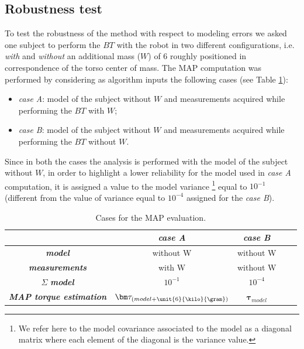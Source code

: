 \subsection{Robustness test}
To test the robustness of the method with respect to modeling errors we asked one subject to
perform the $BT$ with the robot in two different configurations, i.e. \emph{with} and
 \emph{without} an additional mass ($W$) of \unit{6}{\kilo}{\gram} roughly positioned in
  correspondence of the torso center of mass. The MAP computation was performed by
   considering as algorithm inputs the following cases (see Table \ref{table:robustness}):
	\begin{itemize}
		\item \emph{case A}: model of the subject without $W$ and measurements acquired 
		while performing the $BT$ with $W$;
		\item \emph{case B}: model of the subject without $W$ and measurements acquired 
		while performing the $BT$ without $W$.
		\end{itemize} 
Since in both the cases the analysis is performed with the model  of the subject without $W$, in
order to highlight a lower reliability for the model used in 
\emph{case A} computation, it is assigned a value to the model variance
\footnote{We refer here to the model covariance associated to the model as a diagonal matrix 
where each element of the diagonal is the variance value.}
 equal to $10^{-1}$ 
(different from the value of variance equal to $10^{-4}$ assigned for the \emph{case B}).
%
\begin{table}[H]
\caption{Cases for the MAP evaluation.}
\label{table:robustness}
\centering
\footnotesize
   \begin{tabular}{ l|| l | l | l | l | l | l | l | l  } 
    \multicolumn{1}{c||}{} &
    \multicolumn{3}{c|}{\emph{\textbf{case A}}} &
      \multicolumn{3}{c|}{\emph{\textbf{case B}}}\\
    \hline
	\hline
        \multicolumn{1}{|c||}{\emph{\textbf{model}}} &
    \multicolumn{3}{c|}{without W} &
      \multicolumn{3}{c|}{without W} \\
    \hline
    \multicolumn{1}{|c||}{\emph{\textbf{measurements}}} &
    \multicolumn{3}{c|}{with W} &
      \multicolumn{3}{c|}{without W}\\
	\hline
      \multicolumn{1}{|c||}{$\Sigma$ \emph{\textbf{model}}} &
      \multicolumn{3}{c|}{$10^{-1}$} &
        \multicolumn{3}{c|}{$10^{-4}$}\\
     \hline   
     \multicolumn{1}{|c||}{\emph{\textbf{MAP torque estimation}}} &
     \multicolumn{3}{c|}{$\bm \tau_{(model + \unit{6}{\kilo}{\gram})}$} &
       \multicolumn{3}{c|}{$\bm \tau_{model}$}\\
      \hline
    \end{tabular}
\end{table}
